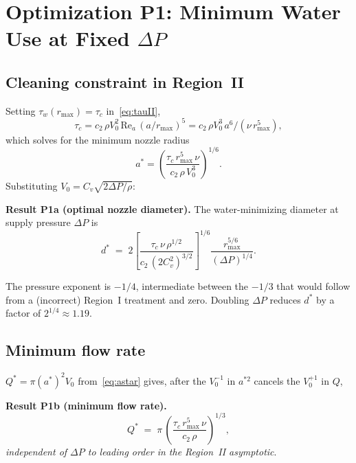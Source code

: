\documentclass[10pt,letterpaper]{article}
\newcommand{\Rey}{\mathrm{Re}}
\begin{document}
\section{Optimization P1: Minimum Water Use at Fixed $\Delta P$}
\label{sec:P1}

\subsection{Cleaning constraint in Region~II}

Setting $\tau_w(r_\mathrm{max}) = \tau_c$ in~\eqref{eq:tauII},
\begin{equation}
  \tau_c = c_2\,\rho V_0^2\,\Rey_a\,(a/r_\mathrm{max})^5
  = c_2\,\rho V_0^3\,a^6 / (\nu\,r_\mathrm{max}^5),
  \label{eq:cleanII}
\end{equation}
which solves for the minimum nozzle radius
\begin{equation}
  a^* = \left(\frac{\tau_c\,r_\mathrm{max}^5\,\nu}{c_2\,\rho\,V_0^3}\right)^{1/6}.
  \label{eq:astar}
\end{equation}
Substituting $V_0 = C_v\sqrt{2\Delta P/\rho}$:
\begin{mdframed}[style=resultbox]
\textbf{Result P1a (optimal nozzle diameter).}
The water-minimizing diameter at supply pressure $\Delta P$ is
\begin{equation}
  d^* \;=\; 2\left[\frac{\tau_c\,\nu\,\rho^{1/2}}{c_2\,(2 C_v^2)^{3/2}}\right]^{1/6}
  \frac{r_\mathrm{max}^{5/6}}{(\Delta P)^{1/4}}.
  \label{eq:dstar}
\end{equation}
\end{mdframed}
The pressure exponent is $-1/4$, intermediate between the $-1/3$ that
would follow from a (incorrect) Region~I treatment and zero. Doubling
$\Delta P$ reduces $d^*$ by a factor of $2^{1/4} \approx 1.19$.

\subsection{Minimum flow rate}

$Q^* = \pi (a^*)^2 V_0$ from~\eqref{eq:astar} gives, after the $V_0^{-1}$
in $a^{*2}$ cancels the $V_0^{+1}$ in $Q$,
\begin{mdframed}[style=resultbox]
\textbf{Result P1b (minimum flow rate).}
\begin{equation}
  Q^* \;=\; \pi\,\left(\frac{\tau_c\,r_\mathrm{max}^5\,\nu}{c_2\,\rho}\right)^{1/3},
  \label{eq:Qstar}
\end{equation}
\emph{independent of $\Delta P$ to leading order in the Region~II asymptotic}.
\end{mdframed}
\end{document}
